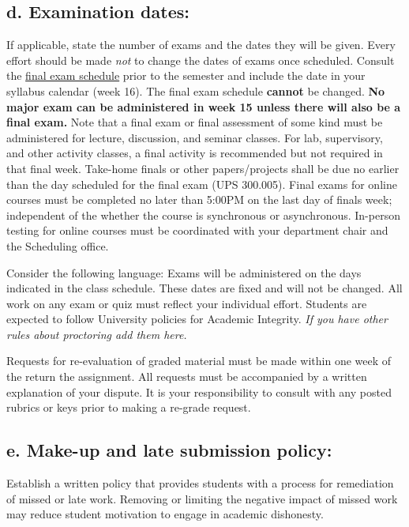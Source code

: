 \documentclass[12pt]{article}
\begin{document}
\subsection*{d. Examination dates:}
{\color{annotationblue}If applicable, state the number of exams and the dates they will be given. Every effort should be made \emph{not} to change the dates of exams once scheduled. Consult the \href{https://www.fullerton.edu/scheduling/final_exam_schedule/}{final exam schedule} prior to the semester and include the date in your syllabus calendar (week 16). The final exam schedule \textbf{cannot} be changed. \textbf{No major exam can be administered in week 15 unless there will also be a final exam.} Note that a final exam or final assessment of some kind must be administered for lecture, discussion, and seminar classes. For lab, supervisory, and other activity classes, a final activity is recommended but not required in that final week. Take-home finals or other papers/projects shall be due no earlier than the day scheduled for the final exam (UPS 300.005). Final exams for online courses must be completed no later than 5:00PM on the last day of finals week; independent of the whether the course is synchronous or asynchronous. In-person testing for online courses must be coordinated with your department chair and the Scheduling office.}

{\color{suggestionred}Consider the following language: Exams will be administered on the days indicated in the class schedule. These dates are fixed and will not be changed. All work on any exam or quiz must reflect your individual effort. Students are expected to follow University policies for Academic Integrity. \emph{If you have other rules about proctoring add them here.}}

{\color{suggestionred}Requests for re-evaluation of graded material must be made within one week of the return the assignment. All requests must be accompanied by a written explanation of your dispute. It is your responsibility to consult with any posted rubrics or keys prior to making a re-grade request.}

\subsection*{e. Make-up and late submission policy:}
{\color{annotationblue}Establish a written policy that provides students with a process for remediation of missed or late work. Removing or limiting the negative impact of missed work may reduce student motivation to engage in academic dishonesty.}
\end{document}
